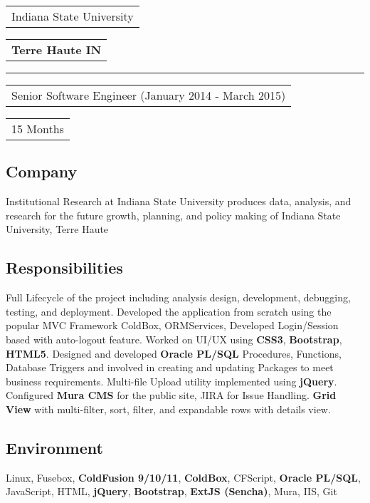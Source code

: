 \documentclass[letterpaper,10pt]{article}
\begin{document}
    \vspace{0.5cm}
    \noindent
    \begin{tabular}[t]{@{}l}
    \Large{Indiana State University}
    \end{tabular}
    \hfill
    \begin{tabular}[t]{l@{}}
    \textbf{Terre Haute IN}
    \end{tabular}
    \noindent\rule{\textwidth}{0.5pt}
    \begin{tabular}[t]{@{}l}
    Senior Software Engineer (January 2014 - March 2015)
    \end{tabular}
    \hfill
    \begin{tabular}[t]{l@{}}
    15 Months
    \end{tabular}

    \subsection{Company}
    Institutional Research at Indiana State University produces data, analysis, and research for the future growth, planning, and policy making of Indiana State University, Terre Haute

    \subsection{Responsibilities}
    Full Lifecycle of the project including analysis design, development, debugging, testing, and deployment. Developed the application from scratch using the popular MVC Framework ColdBox, ORMServices, Developed Login/Session based with auto-logout feature. Worked on UI/UX using \textbf{CSS3}, \textbf{Bootstrap}, \textbf{HTML5}. Designed and developed \textbf{Oracle PL/SQL} Procedures, Functions, Database Triggers and involved in creating and updating Packages to meet business requirements. Multi-file Upload utility implemented using \textbf{jQuery}. Configured \textbf{Mura CMS} for the public site, JIRA for Issue Handling. \textbf{Grid View} with multi-filter, sort, filter, and expandable rows with details view.

    \subsection{Environment}
    Linux, Fusebox, \textbf{ColdFusion 9/10/11}, \textbf{ColdBox}, CFScript, \textbf{Oracle PL/SQL}, JavaScript, HTML, \textbf{jQuery}, \textbf{Bootstrap}, \textbf{ExtJS (Sencha)}, Mura, IIS, Git
\end{document}
